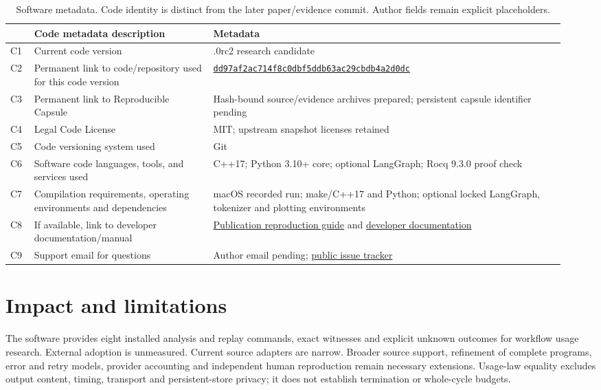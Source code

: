 \documentclass[preprint,12pt,a4paper]{elsarticle}
\newcommand{\SourceRevision}{dd97af2ac714f8c0dbf5ddb63ac29cbdb4a2d0dc}
\begin{document}
\begin{table}[ht]
\centering\footnotesize
\begin{tabular}{@{}p{0.045\linewidth}>{\raggedright\arraybackslash}p{0.30\linewidth}>{\raggedright\arraybackslash}p{0.59\linewidth}@{}}
\toprule
 & Code metadata description & Metadata\\
\midrule
C1 & Current code version & 0.5.0rc2 research candidate\\
C2 & Permanent link to code/repository used for this code version & \href{https://github.com/guyoverclocked/orchlang-compiler-design-project/tree/\SourceRevision}{\texttt{\SourceRevision}}\\
C3 & Permanent link to Reproducible Capsule & Hash-bound source/evidence archives prepared; persistent capsule identifier pending\\
C4 & Legal Code License & MIT; upstream snapshot licenses retained\\
C5 & Code versioning system used & Git\\
C6 & Software code languages, tools, and services used & C++17; Python 3.10+ core; optional LangGraph; Rocq 9.3.0 proof check\\
C7 & Compilation requirements, operating environments and dependencies & macOS recorded run; make/C++17 and Python; optional locked LangGraph, tokenizer and plotting environments\\
C8 & If available, link to developer documentation/manual & \href{https://github.com/guyoverclocked/orchlang-compiler-design-project/blob/\SourceRevision/docs/PUBLICATION_UPGRADE.md}{Publication reproduction guide} and \href{https://github.com/guyoverclocked/orchlang-compiler-design-project/tree/\SourceRevision/docs}{developer documentation}\\
C9 & Support email for questions & Author email pending; \href{https://github.com/guyoverclocked/orchlang-compiler-design-project/issues}{public issue tracker}\\
\bottomrule
\end{tabular}
\caption{Software metadata. Code identity is distinct from the later paper/evidence commit. Author fields remain explicit placeholders.}
\end{table}
\FloatBarrier

\section{Impact and limitations}
The software provides eight installed analysis and replay commands, exact witnesses and explicit unknown outcomes for workflow usage research. External adoption is unmeasured. Current source adapters are narrow. Broader source support, refinement of complete programs, error and retry models, provider accounting and independent human reproduction remain necessary extensions. Usage-law equality excludes output content, timing, transport and persistent-store privacy; it does not establish termination or whole-cycle budgets.
\end{document}

